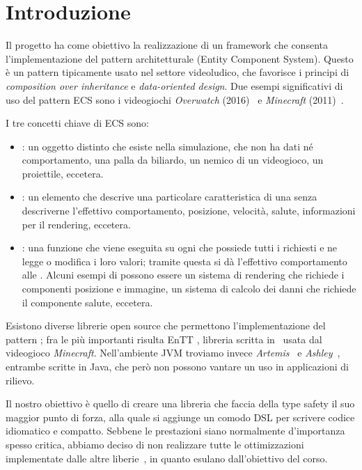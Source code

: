 \chapter*{Introduzione}
Il progetto ha come obiettivo la realizzazione di un framework che consenta l'implementazione del pattern
architetturale \ECS (Entity Component System).
Questo è un pattern tipicamente usato nel settore videoludico, che favorisce i principi di
\textit{composition over inheritance} e \textit{data-oriented design}.
Due esempi significativi di uso del pattern ECS sono i videogiochi \textit{Overwatch} (2016)~\cite{gdc:overwatch}
e \textit{Minecraft} (2011)~\cite{minecraft}.

I tre concetti chiave di ECS sono:
\begin{itemize}
    \item \Entity: un oggetto distinto che esiste nella simulazione, che non ha dati né comportamento,
    \eg una palla da biliardo, un nemico di un videogioco, un proiettile, eccetera.
    \item \Component: un elemento che descrive una particolare caratteristica di una \Entity senza descriverne
    l'effettivo comportamento, \eg posizione, velocità, salute, informazioni per il rendering, eccetera.
    \item \System: una funzione che viene eseguita su ogni \Entity che possiede tutti i \Component richiesti e ne
    legge o modifica i loro valori;
    tramite questa si dà l'effettivo comportamento alle \Entity.
    Alcuni esempi di \System possono essere un sistema di rendering che richiede i componenti posizione e immagine,
    un sistema di calcolo dei danni che richiede il componente salute, eccetera.
\end{itemize}

Esistono diverse librerie open source che permettono l'implementazione del pattern \ECS; fra le più importanti risulta
EnTT \cite{entt}, libreria scritta in \CC\ usata dal videogioco \textit{Minecraft}.
Nell'ambiente JVM troviamo invece \textit{Artemis}~\cite{artemis} e \textit{Ashley}~\cite{ashley}, entrambe scritte in
Java, che però non possono vantare un uso in applicazioni di rilievo.

Il nostro obiettivo è quello di creare una libreria che faccia della type safety il suo maggior punto di forza,
alla quale si aggiunge un comodo DSL per scrivere codice idiomatico e compatto.
Sebbene le prestazioni siano normalmente d'importanza spesso critica, abbiamo deciso di non realizzare tutte le
ottimizzazioni implementate dalle altre liberie~\cite{entt:optimizations}, in quanto esulano dall'obiettivo del corso.